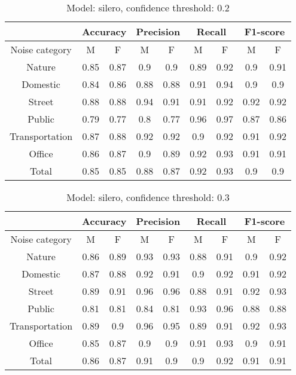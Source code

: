 \documentclass[../main.tex]{subfiles}
\begin{document}
    \begin{table}[H]
    \centering
    \small
    \begin{tabular}{ |c|c|c|c|c|c|c|c|c| }
    \hline
     &\multicolumn{2}{|c|}{Accuracy}&\multicolumn{2}{|c|}{Precision}&\multicolumn{2}{|c|}{Recall}&\multicolumn{2}{|c|}{F1-score} \\ 
    \hline
    Noise category & M & F & M & F & M & F & M & F \\ 
    \hline
    Nature & 0.85 & 0.87 & 0.9 & 0.9 & 0.89 & 0.92 & 0.9 & 0.91 \\ 
    Domestic & 0.84 & 0.86 & 0.88 & 0.88 & 0.91 & 0.94 & 0.9 & 0.9 \\ 
    Street & 0.88 & 0.88 & 0.94 & 0.91 & 0.91 & 0.92 & 0.92 & 0.92 \\ 
    Public & 0.79 & 0.77 & 0.8 & 0.77 & 0.96 & 0.97 & 0.87 & 0.86 \\ 
    Transportation & 0.87 & 0.88 & 0.92 & 0.92 & 0.9 & 0.92 & 0.91 & 0.92 \\ 
    Office & 0.86 & 0.87 & 0.9 & 0.89 & 0.92 & 0.93 & 0.91 & 0.91 \\ 
    Total & 0.85 & 0.85 & 0.88 & 0.87 & 0.92 & 0.93 & 0.9 & 0.9 \\ 
    \hline
    \end{tabular}
    \caption{Model: silero, confidence threshold: 0.2}
    \end{table}
    
    \begin{table}[H]
    \centering
    \small
    \begin{tabular}{ |c|c|c|c|c|c|c|c|c| }
    \hline
     &\multicolumn{2}{|c|}{Accuracy}&\multicolumn{2}{|c|}{Precision}&\multicolumn{2}{|c|}{Recall}&\multicolumn{2}{|c|}{F1-score} \\ 
    \hline
    Noise category & M & F & M & F & M & F & M & F \\ 
    \hline
    Nature & 0.86 & 0.89 & 0.93 & 0.93 & 0.88 & 0.91 & 0.9 & 0.92 \\ 
    Domestic & 0.87 & 0.88 & 0.92 & 0.91 & 0.9 & 0.92 & 0.91 & 0.92 \\ 
    Street & 0.89 & 0.91 & 0.96 & 0.96 & 0.88 & 0.91 & 0.92 & 0.93 \\ 
    Public & 0.81 & 0.81 & 0.84 & 0.81 & 0.93 & 0.96 & 0.88 & 0.88 \\ 
    Transportation & 0.89 & 0.9 & 0.96 & 0.95 & 0.89 & 0.91 & 0.92 & 0.93 \\ 
    Office & 0.85 & 0.87 & 0.9 & 0.9 & 0.91 & 0.93 & 0.9 & 0.91 \\ 
    Total & 0.86 & 0.87 & 0.91 & 0.9 & 0.9 & 0.92 & 0.91 & 0.91 \\ 
    \hline
    \end{tabular}
    \caption{Model: silero, confidence threshold: 0.3}
    \end{table}
    
\end{document}
